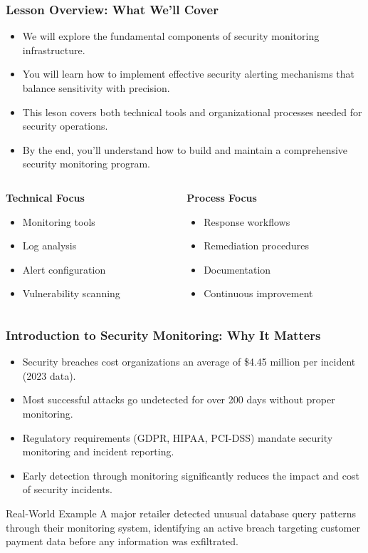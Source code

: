 \documentclass{beamer}
\begin{document}
\begin{frame}
\frametitle{Lesson Overview: What We'll Cover}
\begin{itemize}
\item We will explore the fundamental components of security monitoring infrastructure.
\item You will learn how to implement effective security alerting mechanisms that balance sensitivity with precision.
\item This leson covers both technical tools and organizational processes needed for security operations.
\item By the end, you'll understand how to build and maintain a comprehensive security monitoring program.
\end{itemize}

\begin{columns}[T]
\begin{column}{0.5\textwidth}
\textbf{Technical Focus}
\begin{itemize}
\item Monitoring tools
\item Log analysis
\item Alert configuration
\item Vulnerability scanning
\end{itemize}
\end{column}
\begin{column}{0.5\textwidth}
\textbf{Process Focus}
\begin{itemize}
\item Response workflows
\item Remediation procedures
\item Documentation
\item Continuous improvement
\end{itemize}
\end{column}
\end{columns}
\end{frame}

\begin{frame}
\frametitle{Introduction to Security Monitoring: Why It Matters}
\begin{itemize}
\item Security breaches cost organizations an average of \$4.45 million per incident (2023 data).
\item Most successful attacks go undetected for over 200 days without proper monitoring.
\item Regulatory requirements (GDPR, HIPAA, PCI-DSS) mandate security monitoring and incident reporting.
\item Early detection through monitoring significantly reduces the impact and cost of security incidents.
\end{itemize}

\begin{exampleblock}{Real-World Example}
A major retailer detected unusual database query patterns through their monitoring system, identifying an active breach targeting customer payment data before any information was exfiltrated.
\end{exampleblock}
\end{frame}
\end{document}
